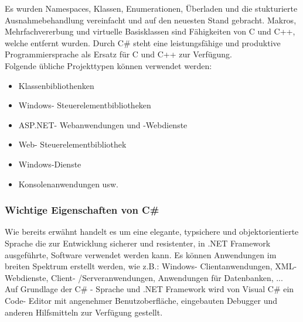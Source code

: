 \documentclass[12pt,a4paper]{report}
\begin{document}
\begin{onehalfspace}
Es wurden Namespaces, Klassen, Enumerationen, Überladen und die stukturierte Ausnahmebehandlung vereinfacht und auf den neuesten Stand gebracht. Makros, Mehrfachvererbung und virtuelle Basisklassen sind Fähigkeiten von C und C++, welche entfernt wurden. Durch C\# steht eine leistungsfähige und produktive Programmiersprache als Ersatz für C und C++ zur Verfügung.
\\Folgende übliche Projekttypen können verwendet werden:
\begin{itemize}
\item Klassenbibliothenken
\item Windows- Steuerelementbibliotheken
\item ASP.NET- Webanwendungen und -Webdienste
\item Web- Steuerelementbibliothek
\item Windows-Dienste
\item Konsolenanwendungen usw.
\end{itemize}

\subsubsection{Wichtige Eigenschaften von C\#}
Wie bereits erwähnt handelt es um eine elegante, typsichere und objektorientierte Sprache die zur Entwicklung sicherer und resistenter, in .NET Framework ausgeführte, Software verwendet werden kann. Es können Anwendungen im breiten Spektrum erstellt werden, wie z.B.: Windows- Clientanwendungen, XML- Webdienste, Client- /Serveranwendungen, Anwendungen für Datenbanken, ...\\

Auf Grundlage der C\# - Sprache und .NET Framework wird von Visual C\# ein Code- Editor mit angenehmer Benutzoberfläche, eingebauten Debugger und anderen Hilfsmitteln zur Verfügung gestellt.\\


\end{onehalfspace}
\end{document}

